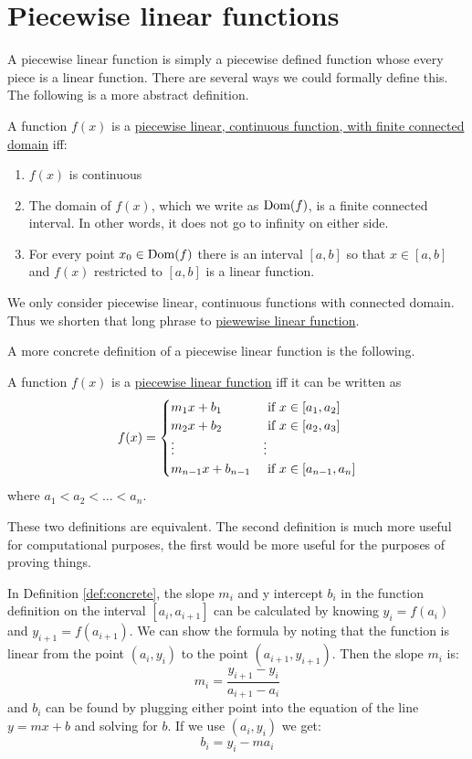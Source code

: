 \documentclass[10pt]{article}
\newcommand{\dom}[1]{\ensuremath{\hbox{Dom}(#1)}}
\begin{document}
\section{Piecewise linear functions}
A piecewise linear function is simply a piecewise defined function whose
every piece is a linear function.  There are several ways we could formally
define this.  The following is a more abstract definition.
\begin{definition}
A function $f(x)$ is a \ul{piecewise linear, continuous function, with
finite connected domain} iff:
\begin{enumerate}
\item $f(x)$ is continuous
\item The domain of $f(x)$, which we write as \dom{f}, is a finite connected
interval.  In other words, it does not go to infinity on either side.
\item For every point $x_0 \in \dom{f}$ there is an interval $[a,b]$ so that
$x \in [a,b]$ and $f(x)$ restricted to $[a,b]$ is a linear function.
\end{enumerate}
\end{definition}
\begin{note}
We only consider piecewise linear, continuous functions with connected domain.
Thus we shorten that long phrase to \ul{piewewise linear function}.
\end{note}
A more concrete definition of a piecewise linear function is the following.
\begin{definition}
\label{def:concrete}
A function $f(x)$ is a \ul{piecewise linear function} iff it can be written as
$$f(x) =
\begin{cases}
m_1 x + b_1 & \hbox{ if } x \in [a_1, a_2] \\
m_2 x + b_2 & \hbox{ if } x \in [a_2, a_3] \\
\vdots & \vdots \\
m_{n-1} x + b_{n-1} & \hbox{ if } x \in [a_{n-1}, a_n]
\end{cases}
$$
where $a_1 < a_2 < \ldots < a_n$.
\end{definition}
\begin{note}
These two definitions are equivalent.  The second definition is much more
useful for computational purposes, the first would be more useful for the
purposes of proving things.
\end{note}
\begin{note}
\label{note:mb}
In Definition \ref{def:concrete}, the slope $m_i$ and y intercept $b_i$ in
the function definition on the interval $[a_i, a_{i+1}]$ can be calculated by
knowing $y_i = f(a_i)$ and $y_{i+1}=f(a_{i+1})$.  We can show the formula by
noting that the function is linear from the point $(a_i, y_i)$ to the point
$(a_{i+1}, y_{i+1})$.  Then the slope $m_i$ is:
$$m_i = \frac{y_{i+1}-y_i}{a_{i+1}-a_i}$$
and $b_i$ can be found by plugging either point into the equation of the line
$y=mx+b$ and solving for $b$.  If we use $(a_i, y_i)$ we get:
$$b_i=y_i-ma_i$$
\end{note}
\end{document}

